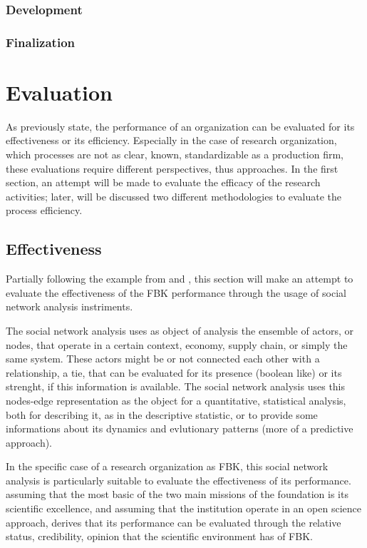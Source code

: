 \subsubsection{Development}
\subsubsection{Finalization}

\section{Evaluation}

As previously state, the performance of an organization can be evaluated for its effectiveness or its efficiency. Especially in the case of research organization, which processes are not as clear, known, standardizable as a production firm, these evaluations require different perspectives, thus approaches. In the first section, an attempt will be made to evaluate the efficacy of the research activities; later, will be discussed two different methodologies to evaluate the process efficiency. 

\subsection{Effectiveness}

Partially following the example from \citet{Giuliani2005} and \citet{Cantner2006}, this section will make an attempt to evaluate the effectiveness of the FBK performance through the usage of social network analysis instriments. 

The social network analysis uses as object of analysis the ensemble of actors, or nodes, that operate in a certain context, economy, supply chain, or simply the same system. These actors might be or not connected each other with a relationship, a tie, that can be evaluated for its presence (boolean like) or its strenght, if this information is available. The social network analysis uses this nodes-edge representation as the object for a quantitative, statistical analysis, both for describing it, as in the descriptive statistic, or to provide some informations about its dynamics and evlutionary patterns (more of a predictive approach).

In the specific case of a research organization as FBK, this social network analysis is particularly suitable to evaluate the effectiveness of its performance. assuming that the most basic of the two main missions of the foundation is its scientific excellence, and assuming that the institution operate in an open science approach, derives that its performance can be evaluated through the relative status, credibility, opinion that the scientific environment has of FBK.

